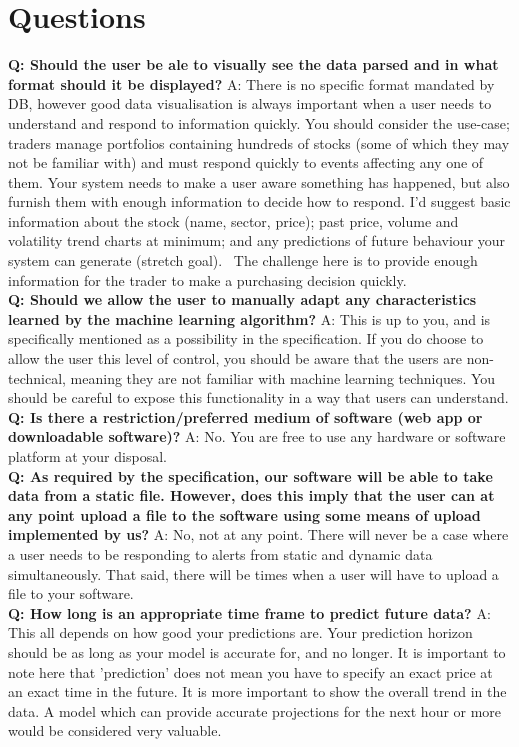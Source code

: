 \documentclass[11pt, oneside, a4paper]{article}
\begin{document}
\section{Questions}
\textbf{Q: Should the user be ale to visually see the data parsed and in what format should it be displayed?}
A: There is no specific format mandated by DB, however good data visualisation is always important when a user needs to
understand and respond to information quickly.
You should consider the use-case; traders manage portfolios containing hundreds of stocks (some of which they may not be
familiar with) and must respond quickly to events affecting any one of them. Your system needs to make a user aware something
has happened, but also furnish them with enough information to decide how to respond. I'd suggest basic information about the
stock (name, sector, price); past price, volume and volatility trend charts at minimum; and any predictions of future behaviour
your system can generate (stretch goal).  The challenge here is to provide enough information for the trader to make a purchasing
decision quickly. \\
\textbf{Q: Should we allow the user to manually adapt any characteristics learned by the machine learning algorithm?}
A: This is up to you, and is specifically mentioned as a possibility in the specification. If you do choose to allow the user
this level of control, you should be aware that the users are non-technical, meaning they are not familiar with machine learning
techniques. You should be careful to expose this functionality in a way that users can understand. \\
\textbf{Q: Is there a restriction/preferred medium of software (web app or downloadable software)?}
A: No. You are free to use any hardware or software platform at your disposal. \\
\textbf{Q: As required by the specification, our software will be able to take data from a static file. However, does this imply
that the user can at any point upload a file to the software using some means of upload implemented by us?}
A: No, not at any point. There will never be a case where a user needs to be responding to alerts from static and dynamic data
simultaneously. That said, there will be times when a user will have to upload a file to your software. \\
\textbf{Q: How long is an appropriate time frame to predict future data?}
A: This all depends on how good your predictions are. Your prediction horizon should be as long as your model is accurate for,
and no longer. It is important to note here that 'prediction' does not mean you have to specify an exact price at an exact time
in the future. It is more important to show the overall trend in the data. A model which can provide accurate projections for the
next hour or more would be considered very valuable.
\end{document}
